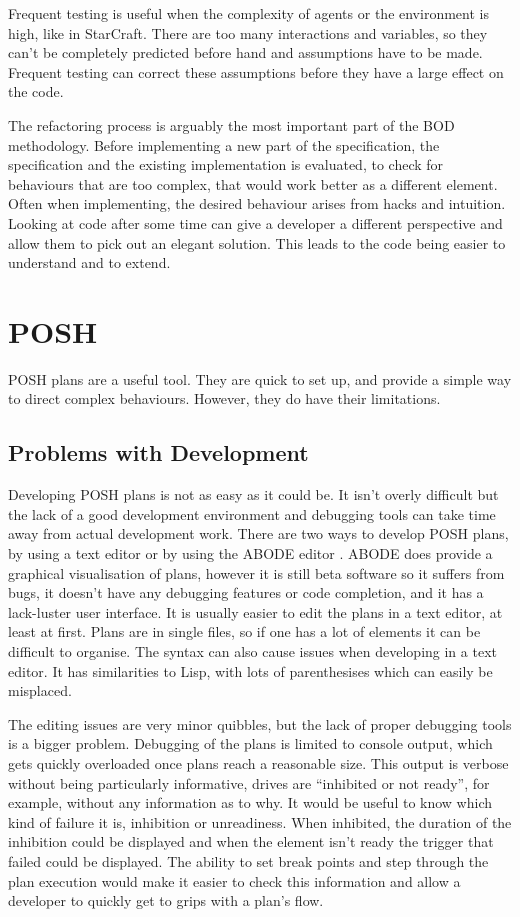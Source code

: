 \documentclass[11pt,openright,a4paper]{report}
\begin{document}
Frequent testing is useful when the complexity of agents or the environment is high, like in StarCraft. There are too many interactions and variables, so they can't be completely predicted before hand and assumptions have to be made. Frequent testing can correct these assumptions before they have a large effect on the code.

The refactoring process is arguably the most important part of the BOD methodology. Before implementing a new part of the specification, the specification and the existing implementation is evaluated, to check for behaviours that are too complex, that would work better as a different element. Often when implementing, the desired behaviour arises from hacks and intuition. Looking at code after some time can give a developer a different perspective and allow them to pick out an elegant solution. This leads to the code being easier to understand and to extend.

\section{POSH}

POSH plans are a useful tool. They are quick to set up, and provide a simple way to direct complex behaviours. However, they do have their limitations.

\subsection{Problems with Development}
Developing POSH plans is not as easy as it could be. It isn't overly difficult but the lack of a good development environment and debugging tools can take time away from actual development work. There are two ways to develop POSH plans, by using a text editor or by using the ABODE editor \cite{abode}. ABODE does provide a graphical visualisation of plans, however it is still beta software so it suffers from bugs, it doesn't have any debugging features or code completion, and it has a lack-luster user interface. It is usually easier to edit the plans in a text editor, at least at first. Plans are in single files, so if one has a lot of elements it can be difficult to organise.  The syntax can also cause issues when developing in a text editor. It has similarities to Lisp, with lots of parenthesises which can easily be misplaced.

The editing issues are very minor quibbles, but the lack of proper debugging tools is a bigger problem. Debugging of the plans is limited to console output, which gets quickly overloaded once plans reach a reasonable size. This output is verbose without being particularly informative, drives are ``inhibited or not ready'', for example, without any information as to why. It would be useful to know which kind of failure it is, inhibition or unreadiness. When inhibited, the duration of the inhibition could be displayed and when the element isn't ready the trigger that failed could be displayed. The ability to set break points and step through the plan execution would make it easier to check this information and allow a developer to quickly get to grips with a plan's flow.
\end{document}
